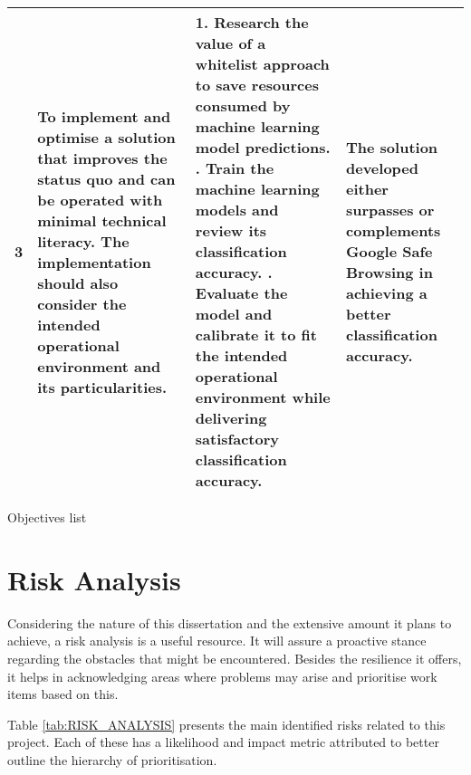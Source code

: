 \begin{landscape}
\begin{singlespace}
\begin{center}
\begin{tabular}{ | m{0.5em} | m{18.5em} | m{23em}| m{16em} | }
				\hline
				\textbf{3}  &
				To implement and optimise a solution that improves the status quo and can be operated with minimal technical literacy. The implementation should also consider the intended operational environment and its particularities.
				            &
				1. Research the value of a whitelist approach to save resources consumed by machine learning model predictions.
				\newline\newline
				2. Train the machine learning models and review its classification accuracy.
				\newline\newline
				3. Evaluate the model and calibrate it to fit the intended operational environment while delivering satisfactory classification accuracy.
				            &
				The solution developed either surpasses or complements Google Safe Browsing in achieving a better classification accuracy.                                 \\

				\hline
			\end{tabular}
			\captionsetup{type=table}\caption{Objectives list}
		\end{center}
	\end{singlespace}
\end{landscape}
\section{Risk Analysis}

Considering the nature of this dissertation and the extensive amount it plans to achieve, a risk analysis is a useful resource. It will assure a proactive stance regarding the obstacles that might be encountered. Besides the resilience it offers, it helps in acknowledging areas where problems may arise and prioritise work items based on this.

Table \ref{tab:RISK_ANALYSIS} presents the main identified risks related to this project. Each of these has a likelihood and impact metric attributed to better outline the hierarchy of prioritisation.

